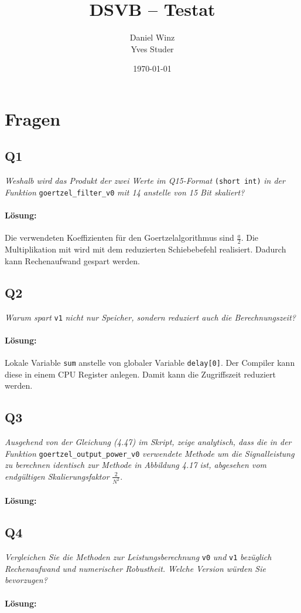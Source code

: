\documentclass[a4,paper,fleqn]{article}
\title{DSVB -- Testat}
\date{\today}
\author{Daniel Winz\\Yves Studer}
\begin{document}
\maketitle
\clearpage

\section{Fragen}

\subsection{Q1}
\label{q1}
\emph{Weshalb wird das Produkt der zwei Werte im Q15-Format}
\verb?(short int)?
\emph{in der Funktion}
\verb?goertzel_filter_v0?
\emph{mit 14 anstelle von 15 Bit skaliert? }
\paragraph{Lösung: }
Die verwendeten Koeffizienten für den Goertzelalgorithmus sind $\frac{a}{2}$. 
Die Multiplikation mit wird mit dem reduzierten Schiebebefehl realisiert. 
Dadurch kann Rechenaufwand gespart werden. 
\subsection{Q2}
\label{q2}
\emph{Warum spart}
\verb?v1?
\emph{nicht nur Speicher, sondern reduziert auch die 
Berechnungszeit?}
\paragraph{Lösung: }
Lokale Variable \verb?sum? anstelle von globaler Variable \verb?delay[0]?. Der 
Compiler kann diese in einem CPU Register anlegen. Damit kann die Zugriffszeit 
reduziert werden. 

\subsection{Q3}
\label{q3}
\emph{Ausgehend von der Gleichung (4.47) im Skript, zeige analytisch, dass die 
in der Funktion}
\verb?goertzel_output_power_v0?
\emph{verwendete Methode um die Signalleistung zu berechnen identisch zur 
Methode in Abbildung 4.17 ist, abgesehen vom endgültigen Skalierungsfaktor}
$\frac{2}{N^2}$.
\paragraph{Lösung: }

\subsection{Q4}
\label{q4}
\emph{Vergleichen Sie die Methoden zur Leistungsberechnung}
\verb?v0?
\emph{und}
\verb?v1?
\emph{bezüglich Rechenaufwand und numerischer Robustheit. Welche Version 
würden Sie bevorzugen?}
\paragraph{Lösung: }
\end{document}
